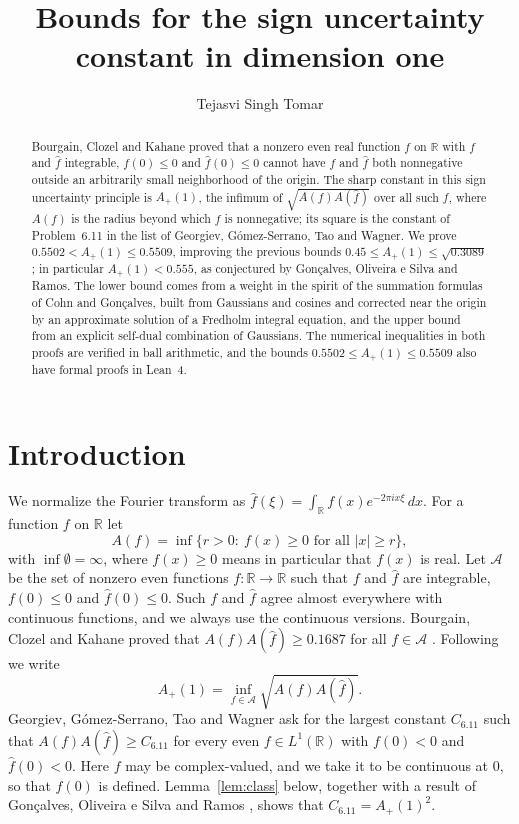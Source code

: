 \documentclass[11pt]{amsart}
\theoremstyle{definition}
\theoremstyle{remark}
\numberwithin{equation}{section}
\newcommand{\R}{\mathbb{R}}
\newcommand{\cA}{\mathcal{A}}
\newcommand{\ft}[1]{\widehat{#1}}
\newcommand{\Ap}{A_+(1)}
\newcommand{\Csix}{C_{6.11}}
\newcommand{\rdec}{0.5502}
\newcommand{\UBC}{0.3089}
\newcommand{\rPdec}{0.5509}
\begin{document}
\title{Bounds for the sign uncertainty constant in dimension one}
\author{Tejasvi Singh Tomar}
\renewcommand{\urladdrname}{{\itshape ORCID}}

\begin{abstract}
Bourgain, Clozel and Kahane proved that a nonzero even real function $f$ on $\R$ with $f$ and $\ft f$ integrable, $f(0)\le0$ and $\ft f(0)\le0$ cannot have $f$ and $\ft f$ both nonnegative outside an arbitrarily small neighborhood of the origin. The sharp constant in this sign uncertainty principle is $\Ap$, the infimum of $\sqrt{A(f)A(\ft f)}$ over all such $f$, where $A(f)$ is the radius beyond which $f$ is nonnegative; its square is the constant of Problem~6.11 in the list of Georgiev, G\'omez-Serrano, Tao and Wagner. We prove $\rdec<\Ap\le\rPdec$, improving the previous bounds $0.45\le\Ap\le\sqrt{\UBC}$; in particular $\Ap<0.555$, as conjectured by Gon\c{c}alves, Oliveira e Silva and Ramos. The lower bound comes from a weight in the spirit of the summation formulas of Cohn and Gon\c{c}alves, built from Gaussians and cosines and corrected near the origin by an approximate solution of a Fredholm integral equation, and the upper bound from an explicit self-dual combination of Gaussians. The numerical inequalities in both proofs are verified in ball arithmetic, and the bounds $\rdec\le\Ap\le\rPdec$ also have formal proofs in Lean~4.
\end{abstract}

\maketitle

\section{Introduction}\label{sec:intro}

We normalize the Fourier transform as $\ft f(\xi)=\int_\R f(x)e^{-2\pi ix\xi}\,dx$. For a function $f$ on $\R$ let
\[
A(f)=\inf\{r>0:\ f(x)\ge0\text{ for all }|x|\ge r\},
\]
with $\inf\emptyset=\infty$, where $f(x)\ge0$ means in particular that $f(x)$ is real. Let $\cA$ be the set of nonzero even functions $f\colon\R\to\R$ such that $f$ and $\ft f$ are integrable, $f(0)\le0$ and $\ft f(0)\le0$. Such $f$ and $\ft f$ agree almost everywhere with continuous functions, and we always use the continuous versions. Bourgain, Clozel and Kahane proved that $A(f)A(\ft f)\ge0.1687$ for all $f\in\cA$ \cite[Th\'eor\`eme~1.1]{BCK10}. Following \cite{CG19} we write
\[
\Ap=\inf_{f\in\cA}\sqrt{A(f)A(\ft f)}.
\]
Georgiev, G\'omez-Serrano, Tao and Wagner \cite[Problem~6.11]{GGTW25} ask for the largest constant $\Csix$ such that $A(f)A(\ft f)\ge\Csix$ for every even $f\in L^1(\R)$ with $f(0)<0$ and $\ft f(0)<0$. Here $f$ may be complex-valued, and we take it to be continuous at $0$, so that $f(0)$ is defined. Lemma~\ref{lem:class} below, together with a result of Gon\c{c}alves, Oliveira e Silva and Ramos \cite{GOR21}, shows that $\Csix=\Ap^2$.
\end{document}
